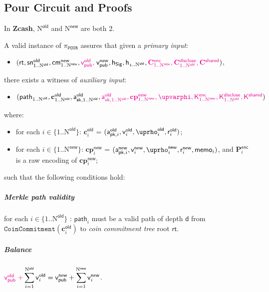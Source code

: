 \documentclass{article}
\newcommand{\changedcolor}{magenta}
\newcommand{\setchanged}{\color{\changedcolor}}
\newcommand{\changed}[1]{{\setchanged{#1}}}
\newcommand{\term}[1]{\textsl{#1}\xspace}
\newcommand{\termbf}[1]{\textbf{#1}\xspace}
\newcommand{\Zcash}{\termbf{Zcash}}
\newcommand{\coinCommitmentTree}{\term{coin commitment tree}}
\newcommand{\AuthPublicOld}[1]{\mathsf{a^{old}_{pk,\mathnormal{#1}}}}
\newcommand{\DiscloseKeyOld}[1]{\mathsf{a^{old}_{vk,\mathnormal{#1}}}}
\newcommand{\AuthPrivateOld}[1]{\mathsf{a^{old}_{sk,\mathnormal{#1}}}}
\newcommand{\AuthPublicNew}[1]{\mathsf{a^{new}_{pk,\mathnormal{#1}}}}
\newcommand{\enc}{\mathsf{enc}}
\newcommand{\disclose}{\mathsf{disclose}}
\newcommand{\shared}{\mathsf{shared}}
\newcommand{\CoinCommitRandOld}[1]{\mathsf{r^{old}_\mathnormal{#1}}}
\newcommand{\CoinCommitRandNew}[1]{\mathsf{r^{new}_\mathnormal{#1}}}
\newcommand{\CoinAddressRandOld}[1]{\mathsf{\uprho^{old}_\mathnormal{#1}}}
\newcommand{\CoinAddressRandNew}[1]{\mathsf{\uprho^{new}_\mathnormal{#1}}}
\newcommand{\CoinAddressPreRand}{\mathsf{\upvarphi}}
\newcommand{\Memo}{\mathsf{memo}}
\newcommand{\Plaintext}{\mathbf{P}}
\newcommand{\Ciphertext}{\mathbf{C}}
\newcommand{\Key}{\mathsf{K}}
\newcommand{\TransmitPlaintext}[1]{\Plaintext^\enc_{#1}}
\newcommand{\TransmitCiphertext}[1]{\Ciphertext^\enc_{#1}}
\newcommand{\TransmitKey}[1]{\Key^\enc_{#1}}
\newcommand{\DerivedKey}[1]{\Key^\disclose_{#1}}
\newcommand{\DiscloseCiphertext}[1]{\Ciphertext^\disclose_{#1}}
\newcommand{\SharedCiphertext}{\Ciphertext^\shared}
\newcommand{\SharedKey}[1]{\Key^\shared_{#1}}
\newcommand{\cmNew}[1]{\mathsf{{cm}^{new}_\mathnormal{#1}}}
\newcommand{\MerkleDepth}{\mathsf{d}}
\newcommand{\snOld}[1]{\mathsf{{sn}^{old}_\mathnormal{#1}}}
\newcommand{\vsum}[2]{\smashoperator[r]{\sum_{#1}^{#2}}}
\newcommand{\rt}{\mathsf{rt}}
\newcommand{\hSig}{\mathsf{h_{Sig}}}
\newcommand{\h}[1]{\mathsf{h_{\mathnormal{#1}}}}
\newcommand{\NOld}{\mathrm{N}^\mathsf{old}}
\newcommand{\NNew}{\mathrm{N}^\mathsf{new}}
\newcommand{\PourStatement}{\texttt{POUR}}
\newcommand{\PourProof}{\pi_{\PourStatement}}
\newcommand{\vpubOld}{\mathsf{v_{pub}^{old}}}
\newcommand{\vpubNew}{\mathsf{v_{pub}^{new}}}
\newcommand{\cOld}[1]{\mathbf{c}_{#1}^\mathsf{old}}
\newcommand{\cpNew}[1]{\mathbf{cp}_{#1}^\mathsf{new}}
\newcommand{\vOld}[1]{\mathsf{v}_{#1}^\mathsf{old}}
\newcommand{\vNew}[1]{\mathsf{v}_{#1}^\mathsf{new}}
\newcommand{\treepath}[1]{\mathsf{path}_{#1}}
\newcommand{\CoinCommitment}{\mathtt{CoinCommitment}}
\begin{document}
\subsection{Pour Circuit and Proofs}

In \Zcash, $\NOld$ and $\NNew$ are both $2$.

A valid instance of $\PourProof$ assures that given a \term{primary input}:

\begin{itemize}
  \item[] $(\rt, \snOld{\mathrm{1}..\NOld}, \cmNew{\mathrm{1}..\NNew}, \changed{\vpubOld,\;}
\vpubNew, \hSig, \h{1..\NOld}, \changed{\TransmitCiphertext{1..\NNew},
\DiscloseCiphertext{1..\NOld}, \SharedCiphertext})$,
\end{itemize}

there exists a witness of \term{auxiliary input}:

\begin{itemize}
  \item[] $(\treepath{1..\NOld}, \cOld{1..\NOld}, \AuthPrivateOld{\mathrm{1}..\NOld},
\changed{\DiscloseKeyOld{\mathrm{1}..\NOld}, \cpNew{1..\NNew},
\CoinAddressPreRand, \TransmitKey{1..\NNew}, \DerivedKey{1..\NOld}, \SharedKey{}})$
\end{itemize}

where:

\begin{itemize}
  \item[] for each $i \in \{1..\NOld\}$: $\cOld{i}$ = $(\AuthPublicOld{i},
\vOld{i}, \CoinAddressRandOld{i}, \CoinCommitRandOld{i})$;
  \item[] for each $i \in \{1..\NNew\}$: $\cpNew{i}$ = $(\AuthPublicNew{i},
\vNew{i}, \CoinAddressRandNew{i}, \CoinCommitRandNew{i}, \Memo_i)$,
and $\TransmitPlaintext{i}$ is a raw encoding of $\cpNew{i}$;
\end{itemize}

such that the following conditions hold:

\subparagraph{Merkle path validity}

for each $i \in \{1..\NOld\}$ \changed{$\mid$ $\vOld{i} \neq 0$}:
$\treepath{i}$ must be a valid path of depth $\MerkleDepth$ from \linebreak
$\CoinCommitment(\cOld{i})$ to \coinCommitmentTree root $\rt$.

\subparagraph{Balance}

$\changed{\vpubOld\; +} \vsum{i=1}{\NOld} \vOld{i} = \vpubNew + \vsum{i=1}{\NNew} \vNew{i}$.
\end{document}
